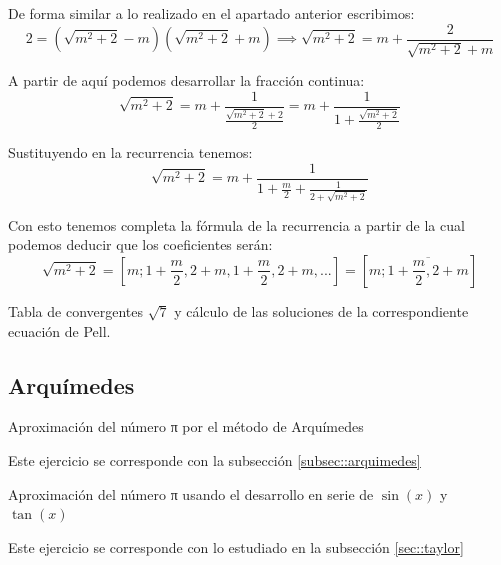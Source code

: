 \begin{problem}[27]
\spart

De forma similar a lo realizado en el apartado anterior escribimos:
\[2=(\sqrt{m^2+2}-m)(\sqrt{m^2+2}+m) \implies \sqrt{m^2+2} = m + \frac{2}{\sqrt{m^2+2}+m}\]

A partir de aquí podemos desarrollar la fracción continua:
\[\sqrt{m^2+2} = m + \frac{1}{\frac{\sqrt{m^2+2}+2}{2}}=m + \frac{1}{1+\frac{\sqrt{m^2+2}}{2}}\]

Sustituyendo en la recurrencia tenemos:
\[\sqrt{m^2+2}  = m + \frac{1}{1+\frac{m}{2}+\frac{1}{2+\sqrt{m^2+2}}} \]

Con esto tenemos completa la fórmula de la recurrencia a partir de la cual podemos deducir que los coeficientes serán:
\[\sqrt{m^2+2}=[m;1+\frac{m}{2},2+m,1+\frac{m}{2},2+m,...] = [m; \overline{1+\frac{m}{2},2+m}]\]
\end{problem}

\begin{problem}[28]
Tabla de convergentes $\sqrt{7}$ y cálculo de las soluciones de la correspondiente ecuación de Pell.
\solution

\end{problem}

\subsection{Arquímedes}

\begin{problem}[29]
Aproximación del número π por el método de Arquímedes
\solution

Este ejercicio se corresponde con la subsección \ref{subsec::arquimedes}

\end{problem}

\begin{problem}[30]
Aproximación del número π usando el desarrollo en serie de $\sin(x)$ y $
\tan(x)$
\solution

Este ejercicio se corresponde con lo estudiado en la subsección \ref{sec::taylor}

\end{problem}